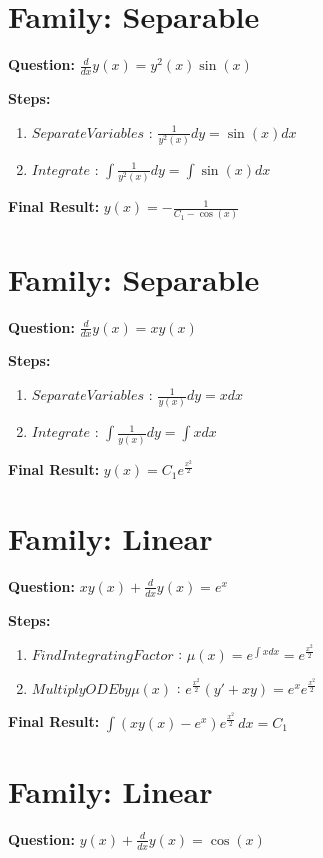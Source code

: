 \documentclass{article}
\begin{document}
\section*{Family: Separable}
\textbf{Question:} $\frac{d}{d x} y{\left(x \right)} = y^{2}{\left(x \right)} \sin{\left(x \right)}$

\textbf{Steps:}
\begin{enumerate}
\item $Separate Variables$ :  $\frac{1}{y^{2}{\left(x \right)}} dy = \sin{\left(x \right)} dx$
\item $Integrate$ :  $\int \frac{1}{y^{2}{\left(x \right)}} dy = \int \sin{\left(x \right)} dx$
\end{enumerate}
\textbf{Final Result:} $y{\left(x \right)} = - \frac{1}{C_{1} - \cos{\left(x \right)}}$

\section*{Family: Separable}
\textbf{Question:} $\frac{d}{d x} y{\left(x \right)} = x y{\left(x \right)}$

\textbf{Steps:}
\begin{enumerate}
\item $Separate Variables$ :  $\frac{1}{y{\left(x \right)}} dy = x dx$
\item $Integrate$ :  $\int \frac{1}{y{\left(x \right)}} dy = \int x dx$
\end{enumerate}
\textbf{Final Result:} $y{\left(x \right)} = C_{1} e^{\frac{x^{2}}{2}}$

\section*{Family: Linear}
\textbf{Question:} $x y{\left(x \right)} + \frac{d}{d x} y{\left(x \right)} = e^{x}$

\textbf{Steps:}
\begin{enumerate}
\item $Find Integrating Factor$ :  $\mu(x) = e^{\int x dx} = e^{\frac{x^{2}}{2}}$
\item $Multiply ODE by \mu(x)$ :  $e^{\frac{x^{2}}{2}}(y' + xy) = e^{x} e^{\frac{x^{2}}{2}}$
\end{enumerate}
\textbf{Final Result:} $\int \left(x y{\left(x \right)} - e^{x}\right) e^{\frac{x^{2}}{2}}\, dx = C_{1}$

\section*{Family: Linear}
\textbf{Question:} $y{\left(x \right)} + \frac{d}{d x} y{\left(x \right)} = \cos{\left(x \right)}$
\end{document}
